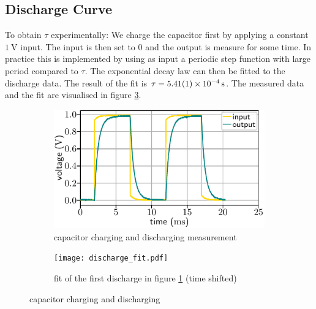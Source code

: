\documentclass[10pt, a4paper]{article} %
\begin{document}
\subsection{Discharge Curve}
To obtain $\tau$ experimentally:
We charge the capacitor first by applying a constant $\SI{1}{\volt}$ input.
The input is then set to $0$ and the output is measure for some time.
In practice this is implemented by using as input a periodic step function with large period compared to $\tau$.
The exponential decay law can then be fitted to the discharge data.
The result of the fit is $\tau = \SI{5.41 \pm 0.01  e-4}{\second}$.
The measured data and the fit are visualised in figure \ref{fig:decay}.
  \begin{figure}
	  \centering
	  \begin{subfigure}[t]{0.495\textwidth}
         \centering
	     \includegraphics[width=\textwidth]{discharge.pdf}%
         \caption{capacitor charging and discharging measurement}\label{fig:decayd}%
     \end{subfigure}\hfill%
	  \begin{subfigure}[t]{0.495\textwidth}
         \centering
	     \texttt{[image: discharge\_fit.pdf]}
		  \caption{fit of the first discharge in figure \ref{fig:decayd} (time shifted)}\label{fig:decayfit}%
     \end{subfigure}%
	  \caption{capacitor charging and discharging}\label{fig:decay}%
\end{figure}
\end{document}
